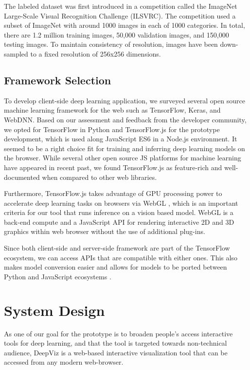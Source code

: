 The labeled dataset was first introduced in a competition called the ImageNet Large-Scale Visual Recognition Challenge (ILSVRC). The competition used a subset of ImageNet with around 1000 images in each of 1000 categories. In total, there are 1.2 million training images, 50,000 validation images, and 150,000 testing images. To maintain consistency of resolution, images have been down-sampled to a fixed resolution of 256x256 dimensions.
    
\subsection{Framework Selection}

To develop client-side deep learning application, we surveyed several open source machine learning framework for the web such as TensorFlow, Keras, and WebDNN. Based on our assessment and feedback from the developer community, we opted for TensorFlow in Python and TensorFlow.js for the prototype development, which is used along JavaScript ES6 in a Node.js environment. It seemed to be a right choice fit for training and inferring deep learning models on the browser. While several other open source JS platforms for machine learning have appeared in recent past, we found TensorFlow.js as feature-rich and well-documented when compared to other web libraries.

Furthermore, TensorFlow.js takes advantage of GPU processing power to accelerate deep learning tasks on browsers via WebGL \cite{Ma2019}, which is an important criteria for our tool that runs inference on a vision based model. WebGL is a back-end compute and a JavaScript API for rendering interactive 2D and 3D graphics within web browser without the use of additional plug-ins.

Since both client-side and server-side framework are part of the TensorFlow ecosystem, we can access APIs that are compatible with either ones. This also makes model conversion easier and allows for models to be ported between Python and JavaScript ecosystems \cite{Smilkov2019}.

\section{System Design}

As one of our goal for the prototype is to broaden people's access interactive tools for deep learning, and that the tool is targeted towards non-technical audience, DeepViz is a web-based interactive visualization tool that can be accessed from any modern web-browser. 

